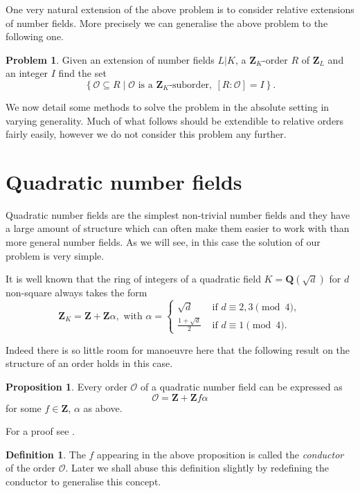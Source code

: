 \documentclass[12pt,a4paper,abstracton,bibtotoc]{scrreprt}
\theoremstyle{definition}
\newtheorem{prop}{Proposition}
\newtheorem{defn}{Definition}
\newtheorem{prob}{Problem}
\newcommand{\QQ}{\mathbf{Q}}
\newcommand{\ZZ}{\mathbf{Z}}
\renewcommand{\O}{\mathcal{O}}
\begin{document}
\minisec{}
One very natural extension of the above problem is to consider relative extensions of number fields.
More precisely we can generalise the above problem to the following one.

\begin{prob} %
\label{prob:rel}
Given an extension of number fields $L|K$, a $\ZZ_K$-order $R$ of $\ZZ_L$ and an integer $I$ find the set
\[
\left\{ \O\subseteq R \mid \O\text{ is a $\ZZ_K$-suborder},\ [R:\O] = I\right\}.
\]
\end{prob}

We now detail some methods to solve the problem in the absolute setting in varying generality.
Much of what follows should be extendible to relative orders fairly easily, however we do not consider this problem any further.

\section{Quadratic number fields}

Quadratic number fields are the simplest non-trivial number fields and they have a large amount of structure which can often make them easier to work with than more general number fields.
As we will see, in this case the solution of our problem is very simple.

It is well known \cite{lang} that the ring of integers of a quadratic field $K = \QQ(\sqrt{d})$ for $d$ non-square always takes the form
\[\ZZ_K = \ZZ + \ZZ\alpha,\text{ with } \alpha =\begin{cases}
\sqrt{d}&\text{ if $d\equiv 2,3\pmod{4}$},\\
\frac{1+\sqrt{d}}{2}&\text{ if $d\equiv 1\pmod{4}$}.
\end{cases}\]

Indeed there is so little room for manoeuvre here that the following result on the structure of an order holds in this case.

\begin{prop}
\label{prop:quadord}
Every order $\O$ of a quadratic number field can be expressed as
\[
\O = \ZZ + \ZZ f\alpha
\]
for some $f\in \ZZ$, $\alpha$ as above.
\end{prop}

For a proof see \cite[pp. 133--134]{cox}.

\begin{defn}
The $f$ appearing in the above proposition is called the \emph{conductor} of the order $\O$.
Later we shall abuse this definition slightly by redefining the conductor to generalise this concept.
\end{defn}
\end{document}
